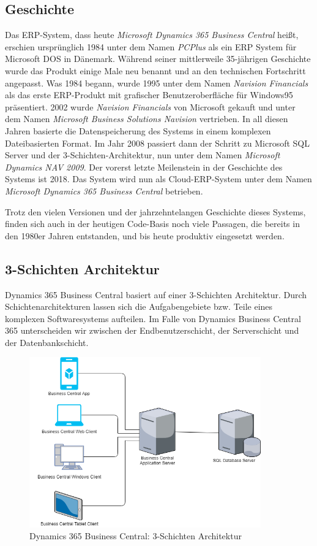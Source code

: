 \subsection{Geschichte}
\label{subsec:Geschichte}
Das ERP-System, dass heute \textit{Microsoft Dynamics 365 Business Central} heißt, erschien ursprünglich 1984 unter dem Namen \textit{PCPlus} als ein ERP System für Microsoft DOS in Dänemark\cite{DesignAndImplementationGayer}. Während seiner mittlerweile 35-jährigen Geschichte wurde das Produkt einige Male neu benannt und an den technischen Fortschritt angepasst. Was 1984 begann, wurde 1995 unter dem Namen \textit{Navision Financials} als das erste ERP-Produkt mit grafischer Benutzeroberfläche für Windows95 präsentiert. 2002 wurde \textit{Navision Financials} von Microsoft gekauft und unter dem Namen \textit{Microsoft Business Solutions Navision} vertrieben. In all diesen Jahren basierte die Datenspeicherung des Systems in einem komplexen Dateibasierten Format. Im Jahr 2008 passiert dann der Schritt zu Microsoft SQL Server und der 3-Schichten-Architektur, nun unter dem Namen \textit{Microsoft Dynamics NAV 2009}. Der vorerst letzte Meilenstein in der Geschichte des Systems ist 2018. Das System wird nun als Cloud-ERP-System unter dem Namen \textit{Microsoft Dynamics 365 Business Central} betrieben.

Trotz den vielen Versionen und der jahrzehntelangen Geschichte dieses Systems, finden sich auch in der heutigen Code-Basis noch viele Passagen, die bereits in den 1980er Jahren entstanden, und bis heute produktiv eingesetzt werden.

\subsection{3-Schichten Architektur}
\label{subsec:3-Schichten Architektur}
Dynamics 365 Business Central basiert auf einer 3-Schichten Architektur. Durch Schichtenarchitekturen lassen sich die Aufgabengebiete bzw. Teile eines komplexen Softwaresystems aufteilen. Im Falle von Dynamics Business Central 365 unterscheiden wir zwischen der Endbenutzerschicht, der Serverschicht und der Datenbankschicht.

\begin{figure}[h]
	\centering
	\includegraphics[width=100mm]{images/3TierArchitecture.png}
	\caption{Dynamics 365 Business Central: 3-Schichten Architektur}
	\label{fig:Image3TierArchitecture}
\end{figure}

